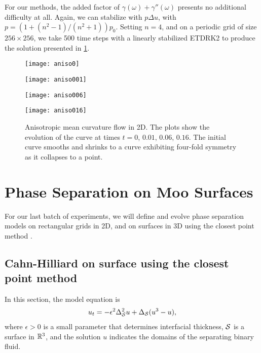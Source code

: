 For our methods, the added factor of $\gamma(\omega) + \gamma''(\omega)$ presents no additional difficulty at all. Again, we can stabilize with $p\Delta u$, with $p=(1+(n^2-1)/(n^2+1))p_0$. Setting $n=4$, and on a periodic grid of size $256\times 256$, we take 500 time steps with a linearly stabilized ETDRK2 to produce the solution presented in \cref{fig:aniso mcm}. 
\begin{figure}
        \centering
\begin{minipage}{0.44\textwidth}
       \texttt{[image: aniso0]}
\end{minipage}
\begin{minipage}{0.44\textwidth}
       \texttt{[image: aniso001]}
\end{minipage}
\begin{minipage}{0.44\textwidth}
       \texttt{[image: aniso006]}
\end{minipage}
\begin{minipage}{0.44\textwidth}
       \texttt{[image: aniso016]}
\end{minipage}
\caption[Anisotropic mean curvature flow.]{Anisotropic mean curvature flow in 2D. The plots show the evolution of the curve at times $t=0$, $0.01$, $0.06$, $0.16$. The initial curve smooths and shrinks to a curve exhibiting four-fold symmetry as it collapses to a point.}
\label{fig:aniso mcm}
\end{figure}

\section{Phase Separation on Moo Surfaces}
For our last batch of experiments, we will define and evolve phase separation models on rectangular grids in 2D, and on surfaces in 3D using the closest point method \cite{ruuth2008simple,macdonald2009implicit}.

\subsection{Cahn-Hilliard on surface using the closest point method}
In this section, the model equation is 
\begin{align}
u_t = -\epsilon^2 \Delta_\S^2 u + \Delta_\S(u^3- u),
\label{ch}
\end{align}
where $\epsilon>0$ is a small parameter that determines interfacial thickness, $\S$ is a surface in $\bR^3$, and the solution $u$ indicates the domains of the separating binary fluid.

